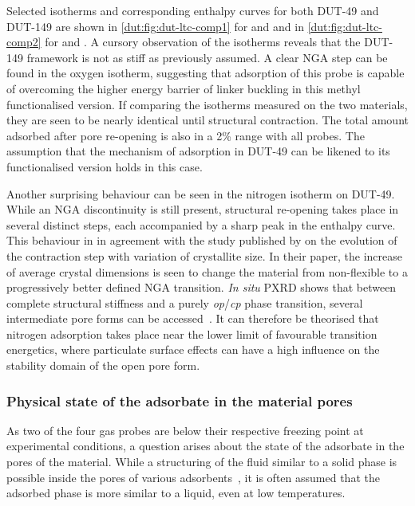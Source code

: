 Selected isotherms and corresponding enthalpy curves for both 
DUT-49 and DUT-149 are shown in \autoref{dut:fig:dut-ltc-comp1}
for  and  and in \autoref{dut:fig:dut-ltc-comp2}
for  and . A cursory observation of the isotherms
reveals that the DUT-149 framework is not as stiff as 
previously assumed. A clear NGA step can be found in the 
oxygen isotherm, suggesting that adsorption of this probe is capable 
of overcoming the higher energy barrier of linker buckling in 
this methyl functionalised version.
If comparing the isotherms measured on the two materials, they
are seen to be nearly identical until structural contraction.
The total amount adsorbed after pore re-opening is also in a 
2\% range with all probes. The assumption that the mechanism 
of adsorption in DUT-49 can be likened to its functionalised
version holds in this case.

Another surprising behaviour
can be seen in the nitrogen isotherm on DUT-49. While an NGA
discontinuity is still present, structural re-opening takes
place in several distinct steps, each accompanied by a sharp 
peak in the enthalpy curve. This behaviour in in
agreement with the study published by 
 \citet{krauseEffectCrystalliteSize2018}
on the evolution of the contraction step with variation of 
crystallite size. In their paper, the increase of average 
crystal dimensions is seen to change the material from non-flexible 
to a progressively better defined NGA transition. \textit{In situ} 
PXRD shows that between complete structural stiffness and a 
purely \textit{op}/\textit{cp} phase transition, several intermediate 
pore forms can be accessed~\cite{krauseEffectCrystalliteSize2018}. 
It can therefore be theorised that 
nitrogen adsorption takes place near the lower limit of 
favourable transition energetics, where particulate surface 
effects can have a high influence on the stability domain of
the open pore form.

\subsubsection{Physical state of the adsorbate in the material pores}

As two of the four gas probes are below their respective freezing point
at experimental conditions, a question arises about the state of
the adsorbate in the pores of the material. While a structuring of
the fluid similar to a solid phase is possible inside the 
pores of various adsorbents~\cite{llewellynAdsorptionMFItypeZeolites1993a},
it is often assumed that the adsorbed phase is more similar to a liquid,
even at low temperatures.

